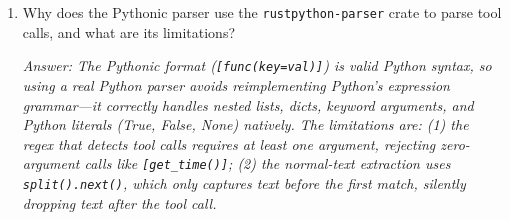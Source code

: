 \begin{enumerate}
  \item Why does the Pythonic parser use the \texttt{rustpython-parser} crate to parse tool calls, and what are its limitations?

  \emph{Answer: The Pythonic format (\texttt{[func(key=val)]}) is valid Python syntax, so using a real Python parser avoids reimplementing Python's expression grammar---it correctly handles nested lists, dicts, keyword arguments, and Python literals (True, False, None) natively. The limitations are: (1) the regex that detects tool calls requires at least one argument, rejecting zero-argument calls like \texttt{[get\_time()]}; (2) the normal-text extraction uses \texttt{split().next()}, which only captures text before the first match, silently dropping text after the tool call.}
\end{enumerate}
